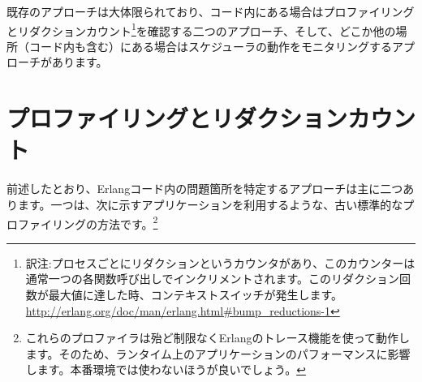 既存のアプローチは大体限られており、コード内にある場合はプロファイリングとリダクションカウント\footnote{訳注:プロセスごとにリダクションというカウンタがあり、このカウンターは通常一つの各関数呼び出しでインクリメントされます。このリダクション回数が最大値に達した時、コンテキストスイッチが発生します。\href{http://erlang.org/doc/man/erlang.html\#bump\_reductions-1}{http://erlang.org/doc/man/erlang.html\#bump\_reductions-1}}を確認する二つのアプローチ、そして、どこか他の場所（コード内も含む）にある場合はスケジューラの動作をモニタリングするアプローチがあります。

\section{プロファイリングとリダクションカウント}
\label{sec:cpu-profiling}

前述したとおり、Erlangコード内の問題箇所を特定するアプローチは主に二つあります。一つは、次に示すアプリケーションを利用するような、古い標準的なプロファイリングの方法です。\footnote{これらのプロファイラは殆ど制限なくErlangのトレース機能を使って動作します。そのため、ランタイム上のアプリケーションのパフォーマンスに影響します。本番環境では使わないほうが良いでしょう。}

